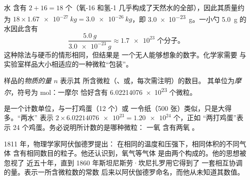 \begin{example}[一小勺水]\label{ex:g10:the-mole:spoon}
水  含有 $2 + 16 = 18$ 个（氧-16
和氢-1 几乎构成了天然水的全部），因此其质量约为
$18 \times \qty{1.67e-27}{kg} = \qty{3.0e-26}{kg}$，即
\qty{3.0e-23}{g}。一小勺 \qty{5.0}{g} 的水因此含有
\[
  \frac{\qty{5.0}{g}}{\qty{3.0e-23}{g}} \approx \num{1.7e23}
  \text{ 个分子。}
\]
这种除法与硬币的情形相同，但结果是
一个无人能够想象的数字。化学家需要
与实验室样品大小相适应的一种微粒“包装”。
\end{example}

\begin{definition}[物质的量与摩尔]\label{def:g10:the-mole:amount}
样品的\emph{物质的量} $n$ 表示其
所含微粒（、或，每次需注明）的数目。
其单位为\emph{摩尔}，符号为 \si{mol}：一摩尔
恰好含有 \num{6.02214076e23} 个微粒。
\end{definition}

\begin{remark}[一打、一令与一摩尔]\label{rem:g10:the-mole:dozen}
是一个计数单位，与一打鸡蛋（12 个）或
一令纸（500 张）类似，只是大得多。“两水”
表示 $2 \times \num{6.02214076e23} = \num{1.20e24}$ 个，正如
“两打鸡蛋”表示 24 个鸡蛋。务必说明所计数的是哪种微粒：
一氧\emph{}  含有两氧
\emph{}。
\end{remark}

\begin{history}[阿伏伽德罗假说，1811 年]
1811 年，物理学家阿伏伽德罗提出：
在相同的温度和压强下，相同体积的不同气体
含有相同数目的粒子。他还认识到，氧气等气体
是由两个构成的。他的思想被忽视了
近五十年，直到 1860 年斯坦尼斯劳·坎尼扎罗用它得到了
一套相互协调的量。表示一所含微粒数的常数
后来以阿伏伽德罗命名，而他从未知道其数值。
\end{history}

